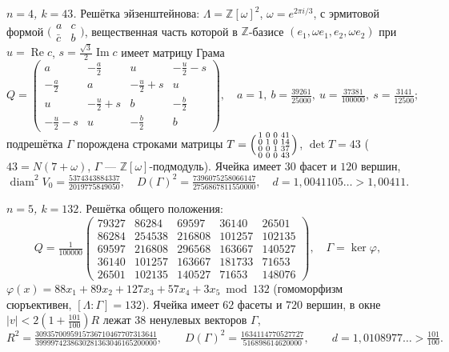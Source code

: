 \documentclass{article}
\newcommand{\Z}{\mathbb{Z}}
\newcommand{\diam}{\operatorname{diam}}
\begin{document}
\emph{$n=4$, $k=43$.} Решётка эйзенштейнова: $\Lambda=\Z[\omega]^2$,
$\omega=e^{2\pi i/3}$, с эрмитовой формой
$\bigl(\begin{smallmatrix}a&c\\\bar c&b\end{smallmatrix}\bigr)$, вещественная
часть которой в $\Z$-базисе $(e_1,\omega e_1,e_2,\omega e_2)$ при
$u=\operatorname{Re}c$, $s=\tfrac{\sqrt3}2\operatorname{Im}c$ имеет матрицу
Грама
\[
Q=\begin{pmatrix}
a & -\tfrac a2 & u & -\tfrac u2-s\\
-\tfrac a2 & a & -\tfrac u2+s & u\\
u & -\tfrac u2+s & b & -\tfrac b2\\
-\tfrac u2-s & u & -\tfrac b2 & b
\end{pmatrix},\quad
a=1,\ b=\tfrac{39261}{25000},\ u=\tfrac{37381}{100000},\ s=\tfrac{3141}{12500};
\]
подрешётка $\Gamma$ порождена строками матрицы
$T=\Bigl(\begin{smallmatrix}1&0&0&41\\0&1&0&14\\0&0&1&37\\0&0&0&43\end{smallmatrix}\Bigr)$,
$\det T=43$ ($43=N(7+\omega)$, $\Gamma$ --- $\Z[\omega]$-подмодуль). Ячейка
имеет $30$ фасет и $120$ вершин,
\[
\diam^2V_0=\tfrac{5374343884337}{2019775849050},\quad
D(\Gamma)^2=\tfrac{7396075258066147}{2756867811550000},\quad
d=1{,}0041105\ldots>1{,}00411 .
\]

\emph{$n=5$, $k=132$.} Решётка общего положения:
\[
Q=\tfrac1{100000}\begin{pmatrix}
79327&86284&69597&36140&26501\\
86284&254538&216808&101257&102135\\
69597&216808&296568&163667&140527\\
36140&101257&163667&181733&71653\\
26501&102135&140527&71653&148076
\end{pmatrix},
\quad
\Gamma=\ker\varphi,
\]
$\varphi(x)=88x_1+89x_2+127x_3+57x_4+3x_5 \bmod 132$ (гомоморфизм сюръективен,
$[\Lambda:\Gamma]=132$). Ячейка имеет $62$ фасеты и $720$ вершин, в окне
$|v|<2(1+\tfrac{101}{100})R$ лежат $38$ ненулевых векторов $\Gamma$,
{\small
\[
R^2=\tfrac{3093570095915736710467707313641}{3999974238630281363046165200000},\qquad
D(\Gamma)^2=\tfrac{1634114770527727}{516898614620000},\qquad
d=1{,}0108977\ldots>\tfrac{101}{100}.
\]}
\end{document}
